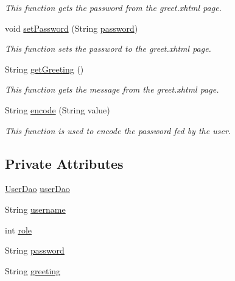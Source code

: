 \begin{DoxyCompactItemize}
\begin{DoxyCompactList}\small\item\em This function gets the password from the greet.\+xhtml page. \end{DoxyCompactList}\item 
void \hyperlink{classorg_1_1jboss_1_1as_1_1quickstarts_1_1greeter_1_1web_1_1_greet_controller_a1e565a4794e7e19e2c3146658c0ee2f2}{set\+Password} (String \hyperlink{classorg_1_1jboss_1_1as_1_1quickstarts_1_1greeter_1_1web_1_1_greet_controller_af2ed4ca9535b77272e1aaabf93fb452b}{password})
\begin{DoxyCompactList}\small\item\em This function sets the password to the greet.\+xhtml page. \end{DoxyCompactList}\item 
String \hyperlink{classorg_1_1jboss_1_1as_1_1quickstarts_1_1greeter_1_1web_1_1_greet_controller_a51563f67ca89305dc06e9700893b1e1d}{get\+Greeting} ()
\begin{DoxyCompactList}\small\item\em This function gets the message from the greet.\+xhtml page. \end{DoxyCompactList}\item 
String \hyperlink{classorg_1_1jboss_1_1as_1_1quickstarts_1_1greeter_1_1web_1_1_greet_controller_ae7bdc856c05b408d1a28731865ed7648}{encode} (String value)
\begin{DoxyCompactList}\small\item\em This function is used to encode the password fed by the user. \end{DoxyCompactList}\end{DoxyCompactItemize}
\subsection*{Private Attributes}
\begin{DoxyCompactItemize}
\item 
\hyperlink{interfaceorg_1_1jboss_1_1as_1_1quickstarts_1_1greeter_1_1domain_1_1_user_dao}{User\+Dao} \hyperlink{classorg_1_1jboss_1_1as_1_1quickstarts_1_1greeter_1_1web_1_1_greet_controller_af49a7ee889501bad17159a9516917c26}{user\+Dao}
\item 
String \hyperlink{classorg_1_1jboss_1_1as_1_1quickstarts_1_1greeter_1_1web_1_1_greet_controller_a3d325f4fda39c4393e9a3ae184de7b42}{username}
\item 
int \hyperlink{classorg_1_1jboss_1_1as_1_1quickstarts_1_1greeter_1_1web_1_1_greet_controller_ab69c435014ea3d9eacb77c7bffae0cb0}{role}
\item 
String \hyperlink{classorg_1_1jboss_1_1as_1_1quickstarts_1_1greeter_1_1web_1_1_greet_controller_af2ed4ca9535b77272e1aaabf93fb452b}{password}
\item 
String \hyperlink{classorg_1_1jboss_1_1as_1_1quickstarts_1_1greeter_1_1web_1_1_greet_controller_af77ccaa3f8ac802b56f86a21ab577766}{greeting}
\end{DoxyCompactItemize}
